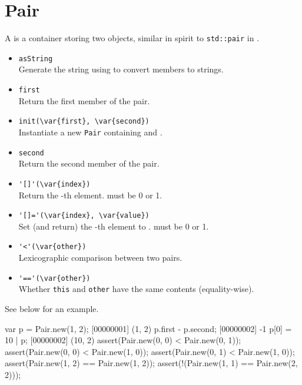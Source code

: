 \section{Pair}

A  is a container storing two objects, similar in spirit to
\lstinline|std::pair| in \Cxx.


\begin{itemize}
\item \lstinline|asString|\\
  Generate the string  using
   to convert members to strings.

\item \lstinline|first|\\
  Return the first member of the pair.

\item \lstinline|init(\var{first}, \var{second})|~\\
  Instantiate a new \lstinline|Pair| containing  and
  .

\item \lstinline|second|\\
  Return the second member of the pair.

\item \lstinline|'[]'(\var{index})|\\
  Return the -th element.   must be 0 or 1.

\item \lstinline|'[]='(\var{index}, \var{value})|\\
  Set (and return) the -th element to .
   must be 0 or 1.

\item \lstinline|'<'(\var{other})|\\
  Lexicographic comparison between two pairs.

\item \lstinline|'=='(\var{other})|\\
  Whether \lstinline|this| and \lstinline|other| have the same
  contents (equality-wise).
\end{itemize}

See below for an example.

\begin{urbiscript}
var p = Pair.new(1, 2);
[00000001] (1, 2)
p.first - p.second;
[00000002] -1
p[0] = 10 | p;
[00000002] (10, 2)
assert(Pair.new(0, 0) < Pair.new(0, 1));
assert(Pair.new(0, 0) < Pair.new(1, 0));
assert(Pair.new(0, 1) < Pair.new(1, 0));
assert(Pair.new(1, 2) == Pair.new(1, 2));
assert(!(Pair.new(1, 1) == Pair.new(2, 2)));
\end{urbiscript}


